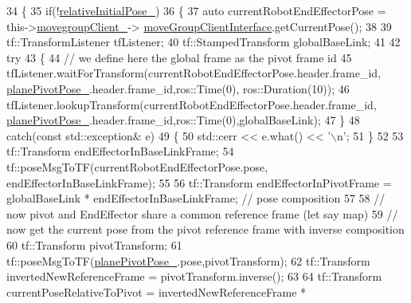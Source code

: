 \begin{DoxyCode}
34         \{
35             \textcolor{keywordflow}{if}(!\hyperlink{classcl__move__group__interface_1_1CbCircularPivotMotion_a1b2cc65d2f27a4dec54c20f1f00d4bb8}{relativeInitialPose\_})
36             \{
37                 \textcolor{keyword}{auto} currentRobotEndEffectorPose = this->\hyperlink{classcl__move__group__interface_1_1CbMoveEndEffectorTrajectory_aea650d3e7836125b32be97392b71a7f3}{movegroupClient\_}->
      \hyperlink{classcl__move__group__interface_1_1ClMoveGroup_a92922ea689e4e1b7b91512c56629c95b}{moveGroupClientInterface}.getCurrentPose();
38 
39                 tf::TransformListener tfListener;
40                 tf::StampedTransform globalBaseLink;
41 
42                 \textcolor{keywordflow}{try}
43                 \{
44                     \textcolor{comment}{// we define here the global frame as the pivot frame id}
45                     tfListener.waitForTransform(currentRobotEndEffectorPose.header.frame\_id, 
      \hyperlink{classcl__move__group__interface_1_1CbCircularPivotMotion_a0994efbe93b9f9a61fcf3703c360cda2}{planePivotPose\_}.header.frame\_id,ros::Time(0), ros::Duration(10));
46                     tfListener.lookupTransform(currentRobotEndEffectorPose.header.frame\_id, 
      \hyperlink{classcl__move__group__interface_1_1CbCircularPivotMotion_a0994efbe93b9f9a61fcf3703c360cda2}{planePivotPose\_}.header.frame\_id,ros::Time(0),globalBaseLink);
47                 \}
48                 \textcolor{keywordflow}{catch}(\textcolor{keyword}{const} std::exception& e)
49                 \{
50                     std::cerr << e.what() << \textcolor{charliteral}{'\(\backslash\)n'};
51                 \}
52 
53                 tf::Transform endEffectorInBaseLinkFrame;
54                 tf::poseMsgToTF(currentRobotEndEffectorPose.pose, endEffectorInBaseLinkFrame);
55 
56                 tf::Transform endEffectorInPivotFrame =  globalBaseLink * endEffectorInBaseLinkFrame; \textcolor{comment}{//
       pose composition}
57 
58                 \textcolor{comment}{// now pivot and EndEffector share a common reference frame (let say map)}
59                 \textcolor{comment}{// now get the current pose from the pivot reference frame with inverse composition}
60                 tf::Transform pivotTransform;
61                 tf::poseMsgToTF(\hyperlink{classcl__move__group__interface_1_1CbCircularPivotMotion_a0994efbe93b9f9a61fcf3703c360cda2}{planePivotPose\_}.pose,pivotTransform);
62                 tf::Transform invertedNewReferenceFrame = pivotTransform.inverse();
63 
64                 tf::Transform currentPoseRelativeToPivot = invertedNewReferenceFrame * 

\end{DoxyCode}
